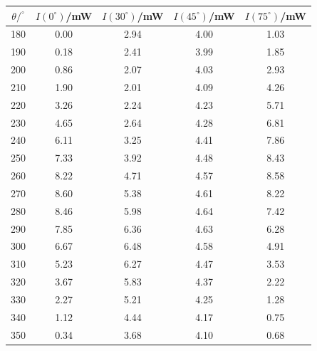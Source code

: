 \begin{tabular}{ccccc}
  \toprule
  $\theta/^{\circ}$ & $I(0^{\circ})$/mW & $I(30^{\circ})$/mW & $I(45^{\circ})$/mW & $I(75^{\circ})$/mW \\
  \midrule
  180 & 0.00 & 2.94 & 4.00 & 1.03 \\
  190 & 0.18 & 2.41 & 3.99 & 1.85 \\
  200 & 0.86 & 2.07 & 4.03 & 2.93 \\
  210 & 1.90 & 2.01 & 4.09 & 4.26 \\
  220 & 3.26 & 2.24 & 4.23 & 5.71 \\
  230 & 4.65 & 2.64 & 4.28 & 6.81 \\
  240 & 6.11 & 3.25 & 4.41 & 7.86 \\
  250 & 7.33 & 3.92 & 4.48 & 8.43 \\
  260 & 8.22 & 4.71 & 4.57 & 8.58 \\
  270 & 8.60 & 5.38 & 4.61 & 8.22 \\
  280 & 8.46 & 5.98 & 4.64 & 7.42 \\
  290 & 7.85 & 6.36 & 4.63 & 6.28 \\
  300 & 6.67 & 6.48 & 4.58 & 4.91 \\
  310 & 5.23 & 6.27 & 4.47 & 3.53 \\
  320 & 3.67 & 5.83 & 4.37 & 2.22 \\
  330 & 2.27 & 5.21 & 4.25 & 1.28 \\
  340 & 1.12 & 4.44 & 4.17 & 0.75 \\
  350 & 0.34 & 3.68 & 4.10 & 0.68 \\
  \bottomrule
\end{tabular}